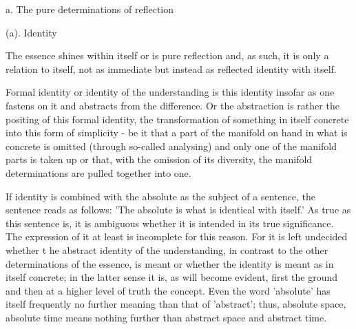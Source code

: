 a. The pure determinations of reflection

(a). Identity

The essence shines within itself
or is pure reflection
and, as such, it is only a relation to itself,
not as immediate but instead
as reflected identity with itself.

    Formal identity or identity of the understanding is this identity
    insofar as one fastens on it and abstracts from the difference.
    Or the abstraction is rather the positing of this formal identity,
    the transformation of something in itself concrete into this form of
    simplicity - be it that a part of the manifold on hand in what is
    concrete is omitted (through so-called analysing) and only one of the
    manifold parts is taken up or that, with the omission of its diversity,
    the manifold determinations are pulled together into one.

    If identity is combined with the absolute as
    the subject of a sentence, the sentence reads as follows:
    'The absolute is what is identical with itself.'
    As true as this sentence is,
    it is ambiguous whether it is intended
    in its true significance.
    The expression of it at least is incomplete for this reason.
    For it is left undecided whether t
    he abstract identity of the understanding,
    in contrast to the other determinations of the essence,
    is meant or whether the identity is meant as in itself concrete;
    in the latter sense it is, as will become evident,
    first the ground and then at a higher level of truth the concept.
    Even the word 'absolute' has itself frequently
    no further meaning than that of 'abstract';
    thus, absolute space, absolute time means nothing further than
    abstract space and abstract time.

